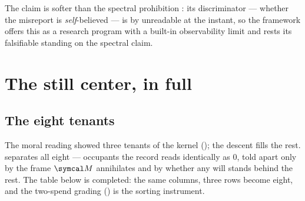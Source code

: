 \documentclass[../main]{subfiles}
\begin{document}
The claim is softer than the spectral prohibition : its discriminator ---
whether the misreport is \emph{self}-believed --- is by  unreadable at the
instant, so the framework offers this as a research program with a built-in observability
limit and rests its falsifiable standing on the spectral claim.

\clearpage
\section{The still center, in full}
\label{sec:still-center}

\subsection{The eight tenants}
\label{subsec:still:tenants}
%
%
The moral reading showed three tenants of the kernel (); the descent
fills the rest.  separates all eight --- occupants the record reads
identically as $0$, told apart only by the frame $\readout$ annihilates and by whether any
will stands behind the rest. The table below is  completed: the same
columns, three rows become eight, and the two-spend grading
() is the sorting instrument.
\end{document}
